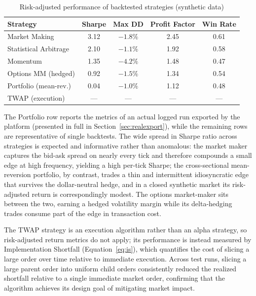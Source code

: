 \documentclass[12pt,oneside,a4paper]{report}
\begin{document}
\begin{table}[H]
\centering
\caption{Risk-adjusted performance of backtested strategies (synthetic data)}
\label{tab:stratresults}
\small
\begin{tabular}{p{1.9in}cccc}
\toprule
\textbf{Strategy} & \textbf{Sharpe} & \textbf{Max DD} & \textbf{Profit Factor} & \textbf{Win Rate} \\
\midrule
Market Making        & 3.12 & $-1.8\%$ & 2.45 & 0.61 \\
Statistical Arbitrage & 2.10 & $-1.1\%$ & 1.92 & 0.58 \\
Momentum             & 1.35 & $-4.2\%$ & 1.48 & 0.47 \\
Options MM (hedged)  & 0.92 & $-1.5\%$ & 1.34 & 0.54 \\
Portfolio (mean-rev.) & 0.04 & $-1.0\%$ & 1.12 & 0.48 \\
TWAP (execution)     & --- & --- & --- & --- \\
\bottomrule
\end{tabular}
\end{table}

The Portfolio row reports the metrics of an actual logged run exported by the platform (presented in full in Section~\ref{sec:realexport}), while the remaining rows are representative of single backtests. The wide spread in Sharpe ratio across strategies is expected and informative rather than anomalous: the market maker captures the bid-ask spread on nearly every tick and therefore compounds a small edge at high frequency, yielding a high per-tick Sharpe; the cross-sectional mean-reversion portfolio, by contrast, trades a thin and intermittent idiosyncratic edge that survives the dollar-neutral hedge, and in a closed synthetic market its risk-adjusted return is correspondingly modest. The options market-maker sits between the two, earning a hedged volatility margin while its delta-hedging trades consume part of the edge in transaction cost.

The TWAP strategy is an execution algorithm rather than an alpha strategy, so risk-adjusted return metrics do not apply; its performance is instead measured by Implementation Shortfall (Equation~\ref{eq:is}), which quantifies the cost of slicing a large order over time relative to immediate execution. Across test runs, slicing a large parent order into uniform child orders consistently reduced the realized shortfall relative to a single immediate market order, confirming that the algorithm achieves its design goal of mitigating market impact.
\end{document}
